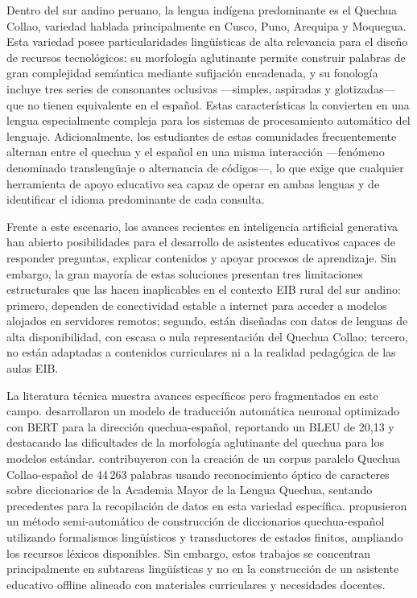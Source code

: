 Dentro del sur andino peruano, la lengua indígena predominante es el Quechua Collao, variedad hablada principalmente en Cusco, Puno, Arequipa y Moquegua. Esta variedad posee particularidades lingüísticas de alta relevancia para el diseño de recursos tecnológicos: su morfología aglutinante permite construir palabras de gran complejidad semántica mediante sufijación encadenada, y su fonología incluye tres series de consonantes oclusivas —simples, aspiradas y glotizadas— que no tienen equivalente en el español. Estas características la convierten en una lengua especialmente compleja para los sistemas de procesamiento automático del lenguaje. Adicionalmente, los estudiantes de estas comunidades frecuentemente alternan entre el quechua y el español en una misma interacción —fenómeno denominado translengüaje o alternancia de códigos—, lo que exige que cualquier herramienta de apoyo educativo sea capaz de operar en ambas lenguas y de identificar el idioma predominante de cada consulta.

Frente a este escenario, los avances recientes en inteligencia artificial generativa han abierto posibilidades para el desarrollo de asistentes educativos capaces de responder preguntas, explicar contenidos y apoyar procesos de aprendizaje. Sin embargo, la gran mayoría de estas soluciones presentan tres limitaciones estructurales que las hacen inaplicables en el contexto EIB rural del sur andino: primero, dependen de conectividad estable a internet para acceder a modelos alojados en servidores remotos; segundo, están diseñadas con datos de lenguas de alta disponibilidad, con escasa o nula representación del Quechua Collao; tercero, no están adaptadas a contenidos curriculares ni a la realidad pedagógica de las aulas EIB.

La literatura técnica muestra avances específicos pero fragmentados en este campo. \citet{SullaTorres2024} desarrollaron un modelo de traducción automática neuronal optimizado con BERT para la dirección quechua-español, reportando un BLEU de 20,13 y destacando las dificultades de la morfología aglutinante del quechua para los modelos estándar. \citet{Orcotoma2025} contribuyeron con la creación de un corpus paralelo Quechua Collao-español de 44\,263 palabras usando reconocimiento óptico de caracteres sobre diccionarios de la Academia Mayor de la Lengua Quechua, sentando precedentes para la recopilación de datos en esta variedad específica. \citet{Duran2026} propusieron un método semi-automático de construcción de diccionarios quechua-español utilizando formalismos lingüísticos y transductores de estados finitos, ampliando los recursos léxicos disponibles. Sin embargo, estos trabajos se concentran principalmente en subtareas lingüísticas y no en la construcción de un asistente educativo offline alineado con materiales curriculares y necesidades docentes.

